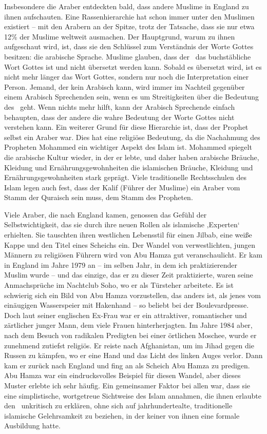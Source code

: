 \documentclass[12pt]{memoir}
\begin{document}
Insbesondere die Araber entdeckten bald,
dass andere Muslime in England zu ihnen aufschauten.
Eine Rassenhierarchie hat schon immer unter den Muslimen existiert –
mit den Arabern an der Spitze,
trotz der Tatsache, dass sie nur etwa 12\% der Muslime weltweit ausmachen.
Der Hauptgrund, warum zu ihnen aufgeschaut wird, ist,
dass sie den Schlüssel zum Verständnis der Worte Gottes besitzen:
die arabische Sprache.
Muslime glauben, dass der \Quran\ das buchstäbliche Wort Gottes ist
und nicht übersetzt werden kann.
Sobald es übersetzt wird, ist es nicht mehr länger das Wort Gottes,
sondern nur noch die Interpretation einer Person.
Jemand, der kein Arabisch kann, wird immer im Nachteil
gegenüber einem Arabisch Sprechenden sein,
wenn es um Streitigkeiten über die Bedeutung des \Quran\ geht.
Wenn nichts mehr hilft, kann der Arabisch Sprechende einfach behaupten,
dass der andere die wahre Bedeutung der Worte Gottes nicht verstehen kann.
Ein weiterer Grund für diese Hierarchie ist, dass der Prophet selbst ein Araber war.
Dies hat eine religiöse Bedeutung,
da die Nachahmung des Propheten Mohammed ein wichtiger Aspekt des Islam ist.
Mohammed spiegelt die arabische Kultur wieder, in der er lebte,
und daher haben arabische Bräuche, Kleidung und Ernährungsgewohnheiten
die islamischen Bräuche,
Kleidung und Ernährungsgewohnheiten stark geprägt.
Viele traditionelle Rechtsschulen des Islam legen auch fest,
dass der Kalif (Führer der Muslime) ein Araber
vom Stamm der Quraisch sein muss, dem Stamm des Propheten.

Viele Araber, die nach England kamen,
genossen das Gefühl der Selbstwichtigkeit,
das sie durch ihre neuen Rollen als islamische ‚Experten‘ erhielten.
Sie tauschten ihren westlichen Lebensstil
für einen Jilbab, eine weiße Kappe und den Titel eines Scheichs ein.
Der Wandel von verwestlichten, jungen Männern zu religiösen Führern
wird von Abu Hamza gut veranschaulicht.
Er kam in England im Jahre 1979 an –
im selben Jahr, in dem ich praktizierender Muslim wurde –
und das einzige, das er zu dieser Zeit praktizierte,
waren seine Anmachsprüche im Nachtclub Soho, wo er als Türsteher arbeitete.
Es ist schwierig sich ein Bild von Abu Hamza vorzustellen,
das anders ist, als jenes vom einäugigen Wasserspeier mit Hakenhand –
so beliebt bei der Boulevardpresse.
Doch laut seiner englischen Ex-Frau war er ein attraktiver,
romantischer und zärtlicher junger Mann, dem viele Frauen hinterherjagten.
Im Jahre 1984 aber, nach dem Besuch von radikalen Predigten
bei einer örtlichen Moschee,
wurde er zunehmend zutiefst religiös.
Er reiste nach Afghanistan, um im Jihad gegen die Russen zu kämpfen,
wo er eine Hand und das Licht des linken Auges verlor.
Dann kam er zurück nach England und fing an als Scheich Abu Hamza zu predigen.
Abu Hamza war ein eindrucksvolles Beispiel für diesen Wandel,
aber dieses Muster erlebte ich sehr häufig.
Ein gemeinsamer Faktor bei allen war,
dass sie eine simplistische, wortgetreue Sichtweise des Islam annahmen,
die ihnen erlaubte den \Quran\ unkritisch zu erklären,
ohne sich auf jahrhundertealte,
traditionelle islamische Gelehrsamkeit zu beziehen,
in der keiner von ihnen eine formale Ausbildung hatte.
\end{document}
